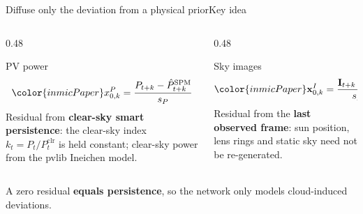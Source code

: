 \documentclass[aspectratio=169,11pt]{beamer}
\begin{document}
\begin{darkframe}
\begin{frame}{Diffuse only the deviation from a physical prior}{Key idea}
\begin{columns}[T]
\begin{column}{0.48\textwidth}
\begin{darkcard}{PV power}
\[\color{inmicPaper} x^P_{0,k}=\frac{P_{t+k}-\hat P^{\mathrm{SPM}}_{t+k}}{s_P}\]
\small Residual from \textbf{clear-sky smart persistence}: the clear-sky index $k_t=P_t/P^{\mathrm{clr}}_t$ is held constant; clear-sky power from the pvlib Ineichen model.
\end{darkcard}
\end{column}
\begin{column}{0.48\textwidth}
\begin{darkcard}{Sky images}
\[\color{inmicPaper} \mathbf x^I_{0,k}=\frac{\mathbf I_{t+k}-\mathbf I_t}{s_I}\]
\small Residual from the \textbf{last observed frame}: sun position, lens rings and static sky need not be re-generated.
\end{darkcard}
\end{column}
\end{columns}
\vspace{3mm}
A zero residual \textbf{equals persistence}, so the network only models cloud-induced deviations.
\end{frame}
\end{darkframe}
\end{document}
